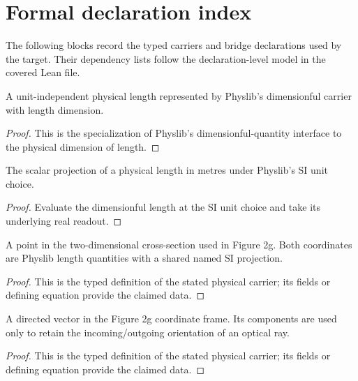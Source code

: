 \section*{Formal declaration index}
The following blocks record the typed carriers and bridge declarations used by the target.  Their dependency lists follow the declaration-level model in the covered Lean file.

\begin{definition}
  \label{def:physics:IPhO_2026_2_C_2:length_quantity}
  A unit-independent physical length represented by Physlib's dimensionful
  carrier with length dimension.
\end{definition}
\begin{proof}
  This is the specialization of Physlib's dimensionful-quantity interface to
  the physical dimension of length.
\end{proof}

\begin{definition}
  \label{def:physics:IPhO_2026_2_C_2:length_si}
  The scalar projection of a physical length in metres under Physlib's SI
  unit choice.
\end{definition}
\begin{proof}
  Evaluate the dimensionful length at the SI unit choice and take its
  underlying real readout.
\end{proof}

\begin{definition}
  \label{def:physics:IPhO_2026_2_C_2:aux001}
  A point in the two-dimensional cross-section used in Figure 2g.  Both
  coordinates are Physlib length quantities with a shared named SI projection.
\end{definition}
\begin{proof}
  This is the typed definition of the stated physical carrier; its fields or defining equation provide the claimed data.
\end{proof}

\begin{definition}
  \label{def:physics:IPhO_2026_2_C_2:aux002}
  A directed vector in the Figure 2g coordinate frame. Its components are used only to retain the incoming/outgoing orientation of an optical ray.
\end{definition}
\begin{proof}
  This is the typed definition of the stated physical carrier; its fields or defining equation provide the claimed data.
\end{proof}

